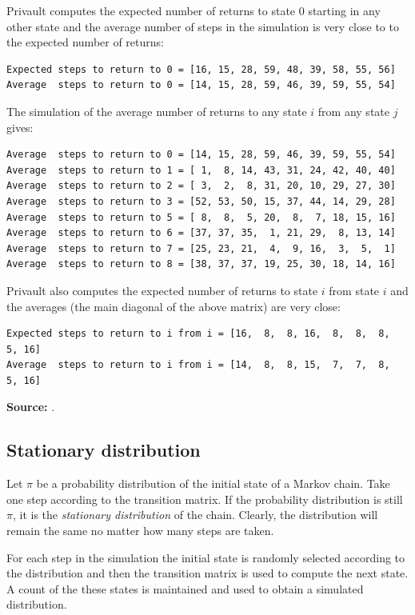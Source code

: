 \documentclass[11pt,a4paper]{article}
\begin{document}
Privault \cite[Sections~5.3]{privault} computes the expected number of returns to state $0$ starting in any other state and the average number of steps in the simulation is very close to to the expected number of returns:
\begin{verbatim}
Expected steps to return to 0 = [16, 15, 28, 59, 48, 39, 58, 55, 56]
Average  steps to return to 0 = [14, 15, 28, 59, 46, 39, 59, 55, 54]
\end{verbatim}
The simulation of the average number of returns to any state $i$ from any state $j$ gives:
\begin{verbatim}
Average  steps to return to 0 = [14, 15, 28, 59, 46, 39, 59, 55, 54]
Average  steps to return to 1 = [ 1,  8, 14, 43, 31, 24, 42, 40, 40]
Average  steps to return to 2 = [ 3,  2,  8, 31, 20, 10, 29, 27, 30]
Average  steps to return to 3 = [52, 53, 50, 15, 37, 44, 14, 29, 28]
Average  steps to return to 5 = [ 8,  8,  5, 20,  8,  7, 18, 15, 16]
Average  steps to return to 6 = [37, 37, 35,  1, 21, 29,  8, 13, 14]
Average  steps to return to 7 = [25, 23, 21,  4,  9, 16,  3,  5,  1]
Average  steps to return to 8 = [38, 37, 37, 19, 25, 30, 18, 14, 16]
\end{verbatim}
Privault \cite[Sections~7.2]{privault} also computes the expected number of returns to state $i$ from state $i$ and the averages (the main diagonal of the above matrix) are very close:
\begin{verbatim}
Expected steps to return to i from i = [16,  8,  8, 16,  8,  8,  8,  5, 16]
Average  steps to return to i from i = [14,  8,  8, 15,  7,  7,  8,  5, 16]
\end{verbatim}

\textbf{Source:} \cite[Section 5.3]{privault}.


\subsection{Stationary distribution}\label{stationary}

Let $\pi$ be a probability distribution of the initial state of a Markov chain. Take one step according to the transition matrix. If the probability distribution is still $\pi$, it is the \emph{stationary distribution} of the chain. Clearly, the distribution will remain the same no matter how many steps are taken.

For each step in the simulation the initial state is randomly selected according to the distribution and then the transition matrix is used to compute the next state. A count of the these states is maintained and used to obtain a simulated distribution.
\end{document}
